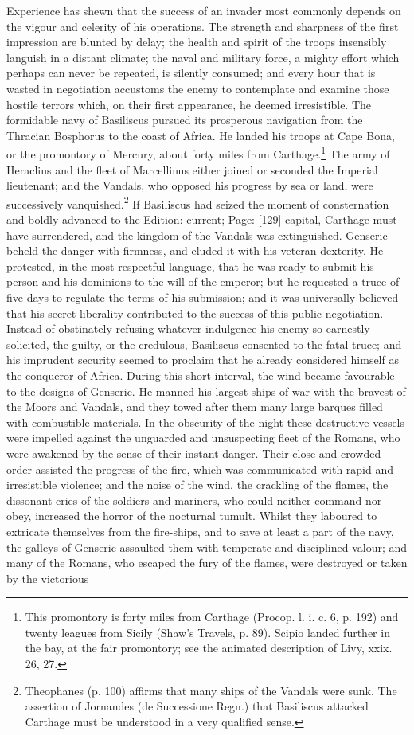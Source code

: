 Experience has shewn that the success of an invader most commonly depends on the vigour and celerity of his operations. The strength and sharpness of the first impression are blunted by delay; the health and spirit of the troops insensibly languish in a distant climate; the naval and military force, a mighty effort which perhaps can never be repeated, is silently consumed; and every hour that is wasted in negotiation accustoms the enemy to contemplate and examine those hostile terrors which, on their first appearance, he deemed irresistible. The formidable navy of Basiliscus pursued its prosperous navigation from the Thracian Bosphorus to the coast of Africa. He landed his troops at Cape Bona, or the promontory of Mercury, about forty miles from Carthage.\footnote{This promontory is forty miles from Carthage (Procop. l. i. c. 6, p. 192) and twenty leagues from Sicily (Shaw\texthebrew{}’s Travels, p. 89). Scipio landed further in the bay, at the fair promontory; see the animated description of Livy, xxix. 26, 27.} The army of Heraclius and the fleet of Marcellinus either joined or seconded the Imperial lieutenant; and the Vandals, who opposed his progress by sea or land, were successively vanquished.\footnote{Theophanes (p. 100) affirms that many ships of the Vandals were sunk. The assertion of Jornandes (de Successione Regn.) that Basiliscus attacked Carthage must be understood in a very qualified sense.} If Basiliscus had seized the moment of consternation and boldly advanced to the Edition: current; Page: [129] capital, Carthage must have surrendered, and the kingdom of the Vandals was extinguished. Genseric beheld the danger with firmness, and eluded it with his veteran dexterity. He protested, in the most respectful language, that he was ready to submit his person and his dominions to the will of the emperor; but he requested a truce of five days to regulate the terms of his submission; and it was universally believed that his secret liberality contributed to the success of this public negotiation. Instead of obstinately refusing whatever indulgence his enemy so earnestly solicited, the guilty, or the credulous, Basiliscus consented to the fatal truce; and his imprudent security seemed to proclaim that he already considered himself as the conqueror of Africa. During this short interval, the wind became favourable to the designs of Genseric. He manned his largest ships of war with the bravest of the Moors and Vandals, and they towed after them many large barques filled with combustible materials. In the obscurity of the night these destructive vessels were impelled against the unguarded and unsuspecting fleet of the Romans, who were awakened by the sense of their instant danger. Their close and crowded order assisted the progress of the fire, which was communicated with rapid and irresistible violence; and the noise of the wind, the crackling of the flames, the dissonant cries of the soldiers and mariners, who could neither command nor obey, increased the horror of the nocturnal tumult. Whilst they laboured to extricate themselves from the fire-ships, and to save at least a part of the navy, the galleys of Genseric assaulted them with temperate and disciplined valour; and many of the Romans, who escaped the fury of the flames, were destroyed or taken by the victorious 
